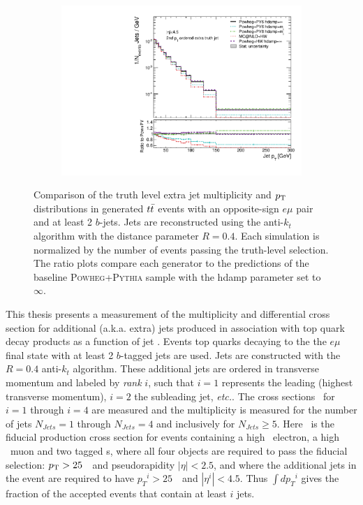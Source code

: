 \begin{figure}
\begin{subfigure}[]{0.45\textwidth}
\end{subfigure} ~
\begin{subfigure}[]{0.45\textwidth}
\includegraphics[width=\textwidth]{fig/MCComp/NLO/TruthPtJet1.pdf}
\end{subfigure}
\caption{Comparison of the truth level extra jet multiplicity and $p_{\text{T}}$ distributions in generated $t\bar{t}$ events with an opposite-sign $e\mu$ pair and at least 2 $b$-jets.  Jets are reconstructed using the anti-$k_t$ algorithm with 
the distance parameter $R=0.4$.
Each simulation is normalized by the number of events passing the truth-level selection.
The ratio plots compare each generator to the predictions of the baseline \textsc{ Powheg+Pythia} sample with the hdamp parameter
set to $\infty$.}
\label{fig:introtjets}
\end{figure}

This thesis presents a measurement of the multiplicity and differential 
cross section for additional (a.k.a. extra) jets produced in 
association with top quark decay products as a function of jet \pT. Events top quarks decaying to the the $e\mu$ final state with at least 2 $b$-tagged jets are used.   Jets are constructed with the $R=0.4$ anti-$k_t$ algorithm. These additional jets are ordered 
in transverse momentum and labeled by \textit{rank} $i$, such that $i=1$ represents 
the leading (highest transverse momentum),  $i=2$ the subleading jet, \textit{ etc.}.  The cross sections
\sigmapti\ for $i=1$ through $i=4$ are measured and 
the multiplicity is measured for the number of jets $N_{Jets}=1$ through $N_{Jets}=4$ 
and inclusively for  $N_{Jets}\ge 5$.  Here \sigemubb\ is the fiducial production cross section 
for  events containing a high \pT\ electron, a high \pT\ muon and two tagged \bjet s,
where all four objects are required to pass the fiducial selection:  $p_{\text{T}}>25$~\GeV\ and pseudorapidity $|\eta|<2.5$,
and where the  additional jets in the event are required to have
${p_T}^{i}>25$~\GeV\ and $|\eta^{i}|<4.5$. Thus  $\int$\sigmapti $d{p_T}^{i}$ gives
the fraction of the accepted events that contain at least $i$ jets.

